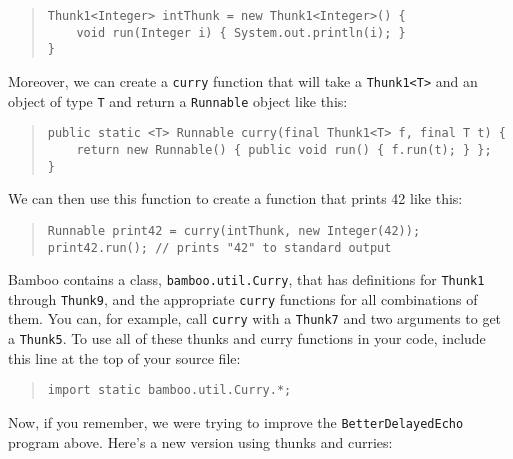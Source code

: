 \documentclass[11pt]{article}
\begin{document}
\begin{quote}
\lstset{language=Java, basicstyle=\small}
\begin{lstlisting}  
Thunk1<Integer> intThunk = new Thunk1<Integer>() { 
    void run(Integer i) { System.out.println(i); }
}
\end{lstlisting}
\end{quote}
Moreover, we can create a \texttt{curry} function that will take a
\texttt{Thunk1<T>} and an object of type \texttt{T} and return a
\texttt{Runnable} object like this: 

\begin{quote}
\lstset{language=Java, basicstyle=\small}
\begin{lstlisting}  
public static <T> Runnable curry(final Thunk1<T> f, final T t) {
    return new Runnable() { public void run() { f.run(t); } };
}
\end{lstlisting}
\end{quote}
We can then use this function to create a function that prints 42 like
this:

\begin{quote}
\lstset{language=Java, basicstyle=\small}
\begin{lstlisting}  
Runnable print42 = curry(intThunk, new Integer(42));
print42.run(); // prints "42" to standard output
\end{lstlisting}
\end{quote}

Bamboo contains a class, \texttt{bamboo.util.Curry}, that has
definitions for \texttt{Thunk1} through \texttt{Thunk9}, and the
appropriate \texttt{curry} functions for all combinations of them.  You
can, for example, call \texttt{curry} with a \texttt{Thunk7} and two
arguments to get a \texttt{Thunk5}.  To use all of these thunks and
curry functions in your code, include this line at the top of your
source file:

\begin{quote}
\lstset{language=Java, basicstyle=\small}
\begin{lstlisting}  
import static bamboo.util.Curry.*;
\end{lstlisting}
\end{quote}

Now, if you remember, we were trying to improve the
\texttt{BetterDelayedEcho} program above.  Here's a new version using
thunks and curries:

\begin{quote}
\lstset{language=Java, basicstyle=\small, numbers=left, numberstyle=\tiny, 
        numberfirstline=true, stepnumber=1, numbersep=5pt}

\end{quote}
\end{document}
